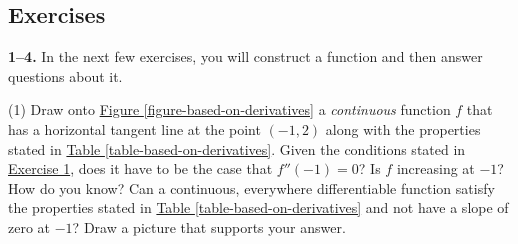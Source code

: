\documentclass[10pt,oneside,]{book}
\theoremstyle{plain}
\theoremstyle{definition}
\numberwithin{equation}{section}
\newcommand{\hrulemedium}{\noalign{\hrule height 0.07em}}
\newcommand{\hrulethick} {\noalign{\hrule height 0.11em}}
\newcounter{figstack}
\newcounter{figindex}
\newlength\fight
\newcommand\pushValignCaptionBottom[5][b]{%
\stepcounter{figstack}%
\expandafter\def\csname %
figalign\romannumeral\value{figstack}\endcsname{#1}%
\expandafter\def\csname %
figtype\romannumeral\value{figstack}\endcsname{#2}%
\expandafter\def\csname %
figwd\romannumeral\value{figstack}\endcsname{#3}%
\expandafter\def\csname %
figcontent\romannumeral\value{figstack}\endcsname{#4}%
\expandafter\def\csname %
figcap\romannumeral\value{figstack}\endcsname{#5}%
\setbox0=\hbox{%
\begin{#2}{#3}#4\end{#2}}%
\ifdim\dimexpr\ht0+\dp0\relax>\fight\global\setlength{\fight}{%
\dimexpr\ht0+\dp0\relax}\fi%
}
\newcommand\popValignCaptionBottom{%
\setcounter{figindex}{0}%
\hfill%
\whiledo{\value{figindex}<\value{figstack}}{%
\stepcounter{figindex}%
\def\tmp{\csname figwd\romannumeral\value{figindex}\endcsname}%
\begin{\csname figtype\romannumeral\value{figindex}\endcsname}[t]{\tmp}%
\centering%
\stackinset{c}{}%
{\csname figalign\romannumeral\value{figindex}\endcsname}{}%
{\csname figcontent\romannumeral\value{figindex}\endcsname}%
{\rule{0pt}{\fight}}\par%
\csname figcap\romannumeral\value{figindex}\endcsname%
\end{\csname figtype\romannumeral\value{figindex}\endcsname}%
\hfill%
}%
\setcounter{figstack}{0}%
\setlength{\fight}{0pt}%
\hfill%
}
\newcommand{\fe}[2]{#1\mathopen{}\left(#2\right)\mathclose{}}
\newcommand{\ointerval}[2]{\left(#1,#2\right)}
\newcommand{\point}[2]{\left(#1,#2\right)}
\newcommand{\fd}[1]{#1'}
\newcommand{\sd}[1]{#1''}
\begin{document}
\subsection[Exercises]{Exercises}\label{exercises-29}
\textbf{1--4. }\hypertarget{exercisegroup-57}{\null}In the next few exercises, you will construct a function and then answer questions about it.%
\par
\begin{exercisegroup}(1)
\exercise[1.]\hypertarget{exercise-based-on-derivatives}{\null}Draw onto \hyperref[figure-based-on-derivatives]{Figure \ref{figure-based-on-derivatives}} a \emph{continuous} function \(f\) that has a horizontal tangent line at the point \(\point{-1}{2}\) along with the properties stated in \hyperref[table-based-on-derivatives]{Table \ref{table-based-on-derivatives}}.%
\exercise[2.]\hypertarget{exercise-279}{\null}Given the conditions stated in \hyperlink{exercise-based-on-derivatives}{Exercise 1}, does it have to be the case that \(\fe{\sd{f}}{-1}=0\)?%
\exercise[3.]\hypertarget{exercise-280}{\null}Is \(f\) increasing at \(-1\)?  How do you know?%
\exercise[4.]\hypertarget{exercise-281}{\null}Can a continuous, everywhere differentiable function satisfy the properties stated in \hyperref[table-based-on-derivatives]{Table \ref{table-based-on-derivatives}} and not have a slope of zero at \(-1\)?  Draw a picture that supports your answer.%
\end{exercisegroup}
\end{document}
